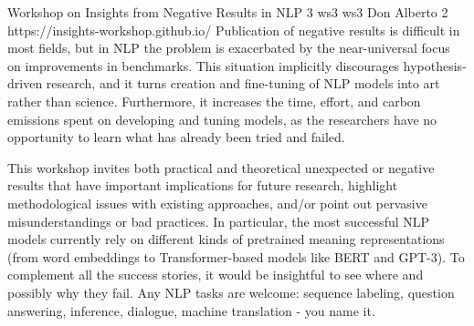\begin{wsschedulenolist}
{Workshop on Insights from Negative Results in NLP}
{3}
{ws3}
{ws3}
{Don Alberto 2}
{https://insights-workshop.github.io/}
    Publication of negative results is difficult in most fields, but in NLP the problem is exacerbated by the near-universal focus on improvements in benchmarks. This situation implicitly discourages hypothesis-driven research, and it turns creation and fine-tuning of NLP models into art rather than science. Furthermore, it increases the time, effort, and carbon emissions spent on developing and tuning models, as the researchers have no opportunity to learn what has already been tried and failed.

    This workshop invites both practical and theoretical unexpected or negative results that have important implications for future research, highlight methodological issues with existing approaches, and/or point out pervasive misunderstandings or bad practices. In particular, the most successful NLP models currently rely on different kinds of pretrained meaning representations (from word embeddings to Transformer-based models like BERT and GPT-3). To complement all the success stories, it would be insightful to see where and possibly why they fail. Any NLP tasks are welcome: sequence labeling, question answering, inference, dialogue, machine translation - you name it.
\end{wsschedulenolist}
